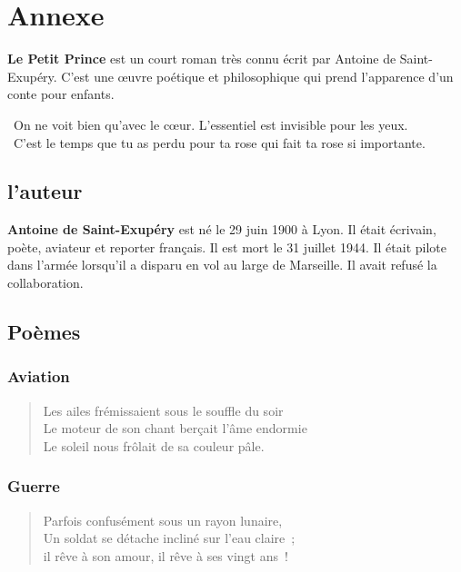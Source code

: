\section*{Annexe}

\textbf{Le Petit Prince} est un court roman très connu écrit par Antoine de Saint-Exupéry. 
C'est une œuvre poétique et philosophique qui prend l'apparence d'un conte pour enfants. 

\begin{center}
  {\selectfont \og On ne voit bien qu'avec le cœur. L'essentiel est invisible pour les yeux. \fg }\\
  {\selectfont \og C'est le temps que tu as perdu pour ta rose qui fait ta rose si importante. \fg}\\

\end{center}

\subsection*{l’auteur}
\textbf{Antoine de Saint-Exupéry} est né le 29 juin 1900 à Lyon. Il était  écrivain, poète, aviateur et reporter français. Il est mort le 31 juillet 1944. Il était pilote dans l’armée lorsqu’il a disparu en vol au large de Marseille. Il avait refusé la collaboration.

\subsection*{Poèmes}

{\selectfont 

  \subsubsection*{Aviation}

  \begin{verse}
    Les ailes frémissaient sous le souffle du soir \\
	  Le moteur de son chant berçait l'âme endormie \\
	  Le soleil nous frôlait de sa couleur pâle.
  \end{verse}
  
  \subsubsection*{Guerre}
  
  \begin{verse}
	  Parfois confusément sous un rayon lunaire,\\
	  Un soldat se détache incliné sur l'eau claire ; \\
	  il rêve à son amour, il rêve à ses vingt ans !
  \end{verse}
}



